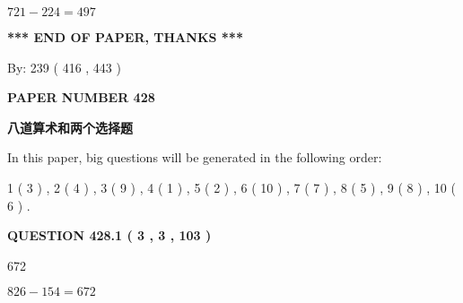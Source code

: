 \documentclass{ctexart}
\begin{document}
$ %
721 -  %
224=   %
497$
 
 
   
   
 \vspace{0.2in}
 
   
   
   
   
\vspace{1.0in} 
{\textbf{\large{ *** END OF PAPER, THANKS *** }}} 
   
   
\hspace{1.0in} By: 
 239 ( 416 ,  443 )
   
   
   
   
\newpage 
\setcounter{page}{ 
   428001 } 
   
   
   
   
 {\textbf{ \Large{ PAPER NUMBER  428  }}}
   
   
\vspace{0.2in}
   
   
   
   
   
   
 \vspace{0.2in}
{\LARGE {\textbf{ 八道算术和两个选择题}}}
   
   
   
\vspace{0.2in}
   
In this paper, big questions will be generated in the following order: 
   
   
   1 ( 3 )
 ,
   2 ( 4 )
 ,
   3 ( 9 )
 ,
   4 ( 1 )
 ,
   5 ( 2 )
 ,
   6 ( 10 )
 ,
   7 ( 7 )
 ,
   8 ( 5 )
 ,
   9 ( 8 )
 ,
   10 ( 6 )
 .
  
\vspace{0.2in}
  
{\textbf{\Large{QUESTION
428.1 
 ( 3 , 3 , 103 )
}}}
  
  
 
 
\noindent{}

672
 
 
 
 
\noindent{}

$ %
826 -  %
154=   %
672$
 
 
  
\vspace{0.2in}
  
\end{document}
